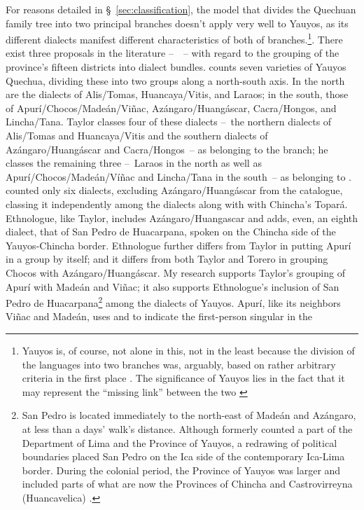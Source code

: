 For reasons detailed in §~\ref{sec:classification}, the model that divides the Quechuan family tree into two principal branches doesn’t apply very well to Yauyos, as its different dialects manifest different characteristics of both of branches.\footnote{Yauyos is, of course, not alone in this, not in the least because the division of the languages into two branches was, arguably, based on rather arbitrary criteria in the first place \citep[See in particular][]{Landerman91}. The significance of Yauyos lies in the fact that it may represent the “missing link” between the two \citep[See in particular][]{Heggarty07}}. There exist three proposals in the literature --~\citet{Taylor00,Torero74,ethnologue}~-- with regard to the grouping of the province’s fifteen districts into dialect bundles. \citet[105]{Taylor00} counts seven varieties of Yauyos Quechua, dividing these into two groups along a north-south axis. In the north are the dialects of Alis/Tomas, Huancaya/Vitis, and Laraos; in the south, those of Apurí/Chocos/Madeán/Viñac, Azángaro/Huangáscar, Cacra/Hongos, and Lincha/Tana. Taylor classes four of these dialects --~the northern dialects of Alis/Tomas and Huancaya/Vitis and the southern dialects of Azángaro/Huangáscar and Cacra/Hongos~-- as belonging to the \QI{} branch; he classes the remaining three --~Laraos in the north as well as Apurí/Cho\-cos/Madeán/Víñac and Lincha/Tana in the south~-- as belonging to \QII. \citet{Torero74} counted only six dialects, excluding Azángaro/Huangáscar from the catalogue, classing it independently among the \QI{} dialects along with with Chincha’s Topará. Ethnologue, like Taylor, includes Azángaro/Huangascar and adds, even, an eighth dialect, that of San Pedro de Huacarpana, spoken on the Chincha side of the Yauyos-Chincha border. Ethnologue further differs from Taylor in putting Apurí in a group by itself; and it differs from both Taylor and Torero in grouping Chocos with Azángaro/Huangáscar. My research supports Taylor’s grouping of Apurí with Madeán and Viñac; it also supports Ethnologue’s inclusion of San Pedro de Huacarpana\footnote{San Pedro is located immediately to the north-east of Madeán and Azángaro, at less than a days’ walk’s distance. Although formerly counted a part of the Department of Lima and the Province of Yauyos, a redrawing of political boundaries placed San Pedro on the Ica side of the contemporary Ica-Lima border. During the colonial period, the Province of Yauyos was larger and included parts of what are now the Provinces of Chincha and Castrovirreyna (Huancavelica) \citet[1.1.3.2.7]{Landerman91}.} among the dialects of Yauyos. Apurí, like its neighbors Viñac and Madeán, uses  and  to indicate the first-person singular in the 